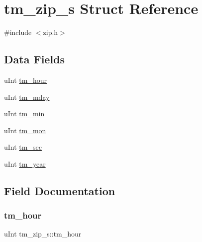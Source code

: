 \hypertarget{structtm__zip__s}{}\section{tm\+\_\+zip\+\_\+s Struct Reference}
\label{structtm__zip__s}


{\ttfamily \#include $<$zip.\+h$>$}

\subsection*{Data Fields}
\begin{DoxyCompactItemize}
\item 
u\+Int \hyperlink{structtm__zip__s_abfde1cc7378be65b4b23e1488e9bd279}{tm\+\_\+hour}
\item 
u\+Int \hyperlink{structtm__zip__s_aebc461dd0a4a7b7ebd4e00de5fbf594d}{tm\+\_\+mday}
\item 
u\+Int \hyperlink{structtm__zip__s_ad539676c1522e9f2cb77cb9e65795e2a}{tm\+\_\+min}
\item 
u\+Int \hyperlink{structtm__zip__s_ae98d11f7e2b2330b3a83efe97ffef574}{tm\+\_\+mon}
\item 
u\+Int \hyperlink{structtm__zip__s_adf073cb37484b209d7f7f0e23275a52d}{tm\+\_\+sec}
\item 
u\+Int \hyperlink{structtm__zip__s_ad58d60c6a536a0861dec11c6ef270753}{tm\+\_\+year}
\end{DoxyCompactItemize}


\subsection{Field Documentation}
\mbox{\label{structtm__zip__s_abfde1cc7378be65b4b23e1488e9bd279}} 
\subsubsection{\texorpdfstring{tm\+\_\+hour}{tm\_hour}}
{\footnotesize\ttfamily u\+Int tm\+\_\+zip\+\_\+s\+::tm\+\_\+hour}

\mbox{\label{structtm__zip__s_aebc461dd0a4a7b7ebd4e00de5fbf594d}} 
